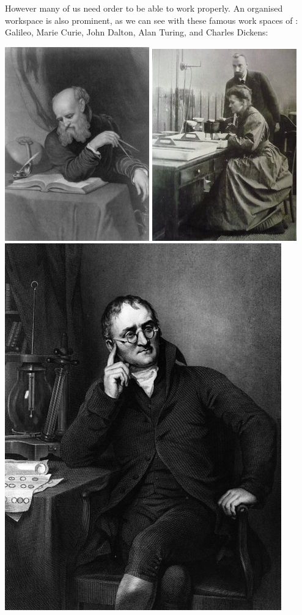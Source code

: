 \documentclass[]{book}
\theoremstyle{definition}
\theoremstyle{definition}
\theoremstyle{definition}
\theoremstyle{remark}
\begin{document}
However many of us need order to be able to work properly. An organised
workspace is also prominent, as we can see with these famous work spaces
of : Galileo, Marie Curie, John Dalton, Alan Turing, and Charles
Dickens:

\includegraphics{imgs/galileo_desk.jpg}
\includegraphics{imgs/marie_curie.jpg}
\includegraphics{imgs/Dalton_John_desk.jpg}
\end{document}
